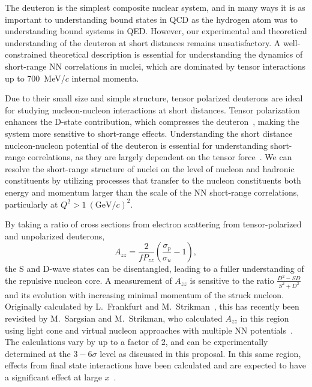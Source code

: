 
The deuteron is the simplest composite nuclear system, and in many ways it is as important to understanding bound states in QCD as the hydrogen atom was to understanding bound systems in QED.  However, our experimental and theoretical understanding of the deuteron at short distances remains unsatisfactory. A well-constrained theoretical description is essential for understanding the dynamics of short-range NN correlations in nuclei, which are dominated by tensor interactions up to 700~MeV/$c$ internal momenta.


Due to their small size and simple structure, tensor polarized deuterons are ideal for studying nucleon-nucleon interactions at short distances. Tensor polarization enhances the D-state contribution, which compresses the deuteron~\cite{Forest:1996kp}, 
making the system more sensitive to short-range effects. Understanding the short distance nucleon-nucleon potential of the deuteron is essential for understanding short-range correlations, as they are largely dependent on the tensor force~\cite{Arrington:2011xs}. We can resolve the short-range structure of nuclei on the level of nucleon and hadronic constituents by utilizing processes that transfer to the nucleon constituents both energy and momentum larger than the scale of the NN short-range correlations, particularly at $Q^2>1~(\mathrm{GeV}/c)^2$.


By taking a ratio of cross sections from electron scattering from tensor-polarized and unpolarized deuterons, 
\begin{equation}
A_{zz}=\frac{2}{fP_{zz}}\left(\frac{\sigma_p}{\sigma_u}-1\right),
\end{equation}
the S and D-wave states can be disentangled, leading to a fuller understanding of the repulsive nucleon core. A measurement of $A_{zz}$ is sensitive to the ratio $\frac{D^2-SD}{S^2+D^2}$ and its evolution with increasing minimal momentum of the struck nucleon. Originally calculated by L.~Frankfurt and M.~Strikman~\cite{Frankfurt:1988nt}, this has recently been revisited by M.~Sargsian and M.~Strikman, who calculated $A_{zz}$ in this region using light cone and virtual nucleon approaches with multiple NN potentials~\cite{Sargsian:2014fla}. The calculations vary by up to a factor of 2, and can be experimentally determined at the $3-6\sigma$ level as discussed in this proposal. In this same region, effects from final state interactions have been calculated and are expected to have a significant effect at large $x$~\cite{cosyn-convo}.


